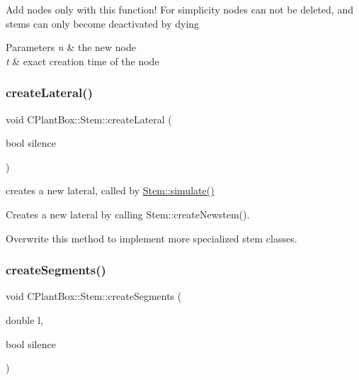Add nodes only with this function! For simplicity nodes can not be deleted, and stems can only become deactivated by dying


\begin{DoxyParams}{Parameters}
{\em n} & the new node \\
\hline
{\em t} & exact creation time of the node \\
\hline
\end{DoxyParams}
\mbox{\label{classCPlantBox_1_1Stem_a8645ec8904c0b5207f6c37f7dd5e2d53}} 
\subsubsection{\texorpdfstring{create\+Lateral()}{createLateral()}}
{\footnotesize\ttfamily void C\+Plant\+Box\+::\+Stem\+::create\+Lateral (\begin{DoxyParamCaption}\item[{bool}]{silence }\end{DoxyParamCaption})\hspace{0.3cm}{\ttfamily [protected]}}



creates a new lateral, called by \hyperlink{classCPlantBox_1_1Stem_ad2f7f8607fe02dbe2f4d4335248cf90b}{Stem\+::simulate()} 

Creates a new lateral by calling Stem\+::create\+Newstem().

Overwrite this method to implement more specialized stem classes. \mbox{\label{classCPlantBox_1_1Stem_a9f08383c2fc5f0927a2ff3a5ecd5f0a5}} 
\subsubsection{\texorpdfstring{create\+Segments()}{createSegments()}}
{\footnotesize\ttfamily void C\+Plant\+Box\+::\+Stem\+::create\+Segments (\begin{DoxyParamCaption}\item[{double}]{l,  }\item[{bool}]{silence }\end{DoxyParamCaption})\hspace{0.3cm}{\ttfamily [protected]}}



